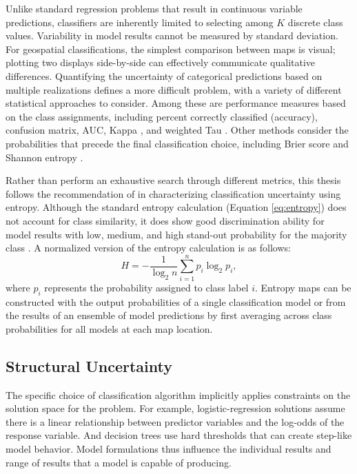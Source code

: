 Unlike standard regression problems that result in continuous variable predictions, classifiers are inherently limited to selecting among $K$ discrete class values. Variability in model results cannot be measured by standard deviation. For geospatial classifications, the simplest comparison between maps is visual; plotting two displays side-by-side can effectively communicate qualitative differences. Quantifying the uncertainty of categorical predictions based on multiple realizations defines a more difficult problem, with a variety of different statistical approaches to consider. Among these are performance measures based on the class assignments, including percent correctly classified (accuracy), confusion matrix, AUC, Kappa \citep{cohen_coefficient_1960}, and weighted Tau \citep{ma_tau_1995}. Other methods consider the probabilities that precede the final classification choice, including Brier score \citep{brier_verification_1950} and Shannon entropy \citep{shannon_mathematical_1948}.

Rather than perform an exhaustive search through different metrics, this thesis follows the recommendation of \citet{beaudette_accuracy_2020} in characterizing classification uncertainty using entropy. Although the standard entropy calculation (Equation \ref{eq:entropy}) does not account for class similarity, it does show good discrimination ability for model results with low, medium, and high stand-out probability for the majority class \citep{beaudette_accuracy_2020}. A normalized version of the entropy calculation is as follows:
\begin{equation}
\label{eq:norm_entropy}
    H = -\frac{1}{\log_2{n}}\sum_{i=1}^{n}{p_i \log_2{p_i}}%
    ,
\end{equation}
where $p_i$ represents the probability assigned to class label $i$. Entropy maps can be constructed with the output probabilities of a single classification model or from the results of an ensemble of model predictions by first averaging across class probabilities for all models at each map location.

\subsection{Structural Uncertainty}\label{ch3:structural_uncertainty}

The specific choice of classification algorithm implicitly applies constraints on the solution space for the problem. For example, logistic-regression solutions assume there is a linear relationship between predictor variables and the log-odds of the response variable. And decision trees use hard thresholds that can create step-like model behavior. Model formulations thus influence the individual results and range of results that a model is capable of producing.

